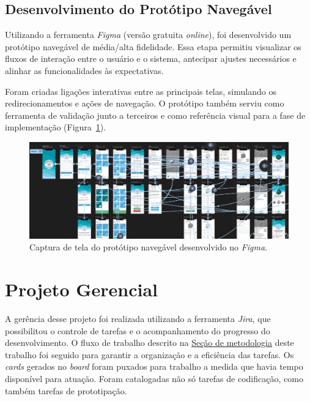 \subsection{Desenvolvimento do Protótipo Navegável}

Utilizando a ferramenta \textit{Figma} (versão gratuita \textit{online}), foi desenvolvido um
protótipo navegável de média/alta fidelidade. Essa etapa permitiu visualizar os fluxos de 
interação entre o usuário e o sistema, antecipar ajustes necessários e alinhar as funcionalidades 
às expectativas.

Foram criadas ligações interativas entre as principais telas, simulando os redirecionamentos e 
ações de navegação. O protótipo também serviu como ferramenta de validação junto a terceiros e 
como referência visual para a fase de implementação (Figura~\ref{fig:prototipo-fluxo-navegacao}).

\begin{figure}[H]
    \centering
    \includegraphics[width=\textwidth]{imagens/prototipo-navegavel-figma.png}
    \caption{Captura de tela do protótipo navegável desenvolvido no \textit{Figma}.}
    \label{fig:prototipo-fluxo-navegacao}
\end{figure}

\section{Projeto Gerencial}
A gerência desse projeto foi realizada utilizando a ferramenta \textit{Jira}, que possibilitou o
controle de tarefas e o acompanhamento do progresso do desenvolvimento. O fluxo de trabalho
descrito na \hyperref[sec:metodologia-desenv-software]{Seção de metodologia} deste trabalho foi 
seguido para garantir a organização e a eficiência
das tarefas. Os \textit{cards} gerados no \textit{board} foram puxados para trabalho a medida que 
havia tempo disponível para atuação. Foram catalogadas não só tarefas de codificação, como 
também tarefas de prototipação.

